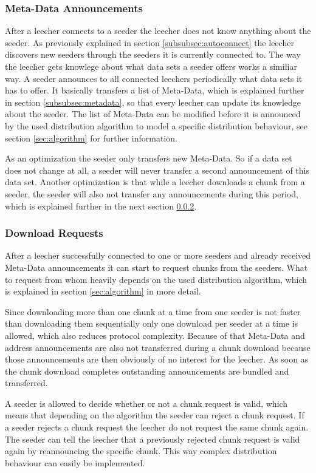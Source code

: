 \subsubsection{Meta-Data Announcements}
After a leecher connects to a seeder the leecher does not know anything about the seeder. As previously explained in section \ref{subsubsec:autoconnect} the leecher discovers new seeders through the seeders it is currently connected to. The way the leecher gets knowlege about what data sets a seeder offers works a similiar way. A seeder announces to all connected leechers periodically what data sets it has to offer. It basically transfers a list of Meta-Data, which is explained further in section \ref{subsubsec:metadata}, so that every leecher can update its knowledge about the seeder. The list of Meta-Data can be modified before it is announced by the used distribution algorithm to model a specific distribution behaviour, see section \ref{sec:algorithm} for further information.

As an optimization the seeder only transfers new Meta-Data. So if a data set does not change at all, a seeder will never transfer a second announcement of this data set. Another optimization is that while a leecher downloads a chunk from a seeder, the seeder will also not transfer any announcements during this period, which is explained further in the next section \ref{subsubsec:downloadreq}.


\subsubsection{Download Requests}
\label{subsubsec:downloadreq}
After a leecher successfully connected to one or more seeders and already received Meta-Data announcements it can start to request chunks from the seeders. What to request from whom heavily depends on the used distribution algorithm, which is explained in section \ref{sec:algorithm} in more detail. 

Since downloading more than one chunk at a time from one seeder is not faster than downloading them sequentially only one download per seeder at a time is allowed, which also reduces protocol complexity. Because of that Meta-Data and address announcements are also not transferred during a chunk download because those announcements are then obviously of no interest for the leecher. As soon as the chunk download completes outstanding announcements are bundled and transferred.

A seeder is allowed to decide whether or not a chunk request is valid, which means that depending on the algorithm the seeder can reject a chunk request. If a seeder rejects a chunk request the leecher do not request the same chunk again. The seeder can tell the leecher that a previously rejected chunk request is valid again by reannouncing the specific chunk. This way complex distribution behaviour can easily be implemented.


